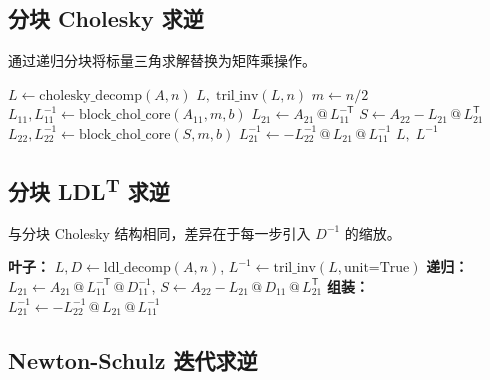 \documentclass[11pt,a4paper]{ctexart}
\begin{document}
\subsection{分块 Cholesky 求逆}

通过递归分块将标量三角求解替换为矩阵乘操作。

\begin{algorithm}[H]
\caption{分块 Cholesky 求逆（递归核心）}
\begin{algorithmic}[1]
        \State $L \gets \text{cholesky\_decomp}(A, n)$ 
        \State \Return $L,\; \text{tril\_inv}(L, n)$
    \EndIf
    \State $m \gets n/2$
    \State $L_{11}, L_{11}^{-1} \gets \text{block\_chol\_core}(A_{11}, m, b)$
    \State $L_{21} \gets A_{21} \mathbin{@} L_{11}^{-{\mathsf T}}$ 
    \State $S \gets A_{22} - L_{21} \mathbin{@} L_{21}^{\mathsf T}$ 
    \State $L_{22}, L_{22}^{-1} \gets \text{block\_chol\_core}(S, m, b)$
    \State $L^{-1}_{21} \gets -L_{22}^{-1} \mathbin{@} L_{21} \mathbin{@} L_{11}^{-1}$ 
    \State \Return $L,\; L^{-1}$
\EndFunction
\end{algorithmic}
\end{algorithm}

\subsection{分块 LDL\textsuperscript{T} 求逆}

与分块 Cholesky 结构相同，差异在于每一步引入 $D^{-1}$ 的缩放。

\begin{algorithm}[H]
\caption{分块 LDL\textsuperscript{T} 求逆（递归核心）}
\begin{algorithmic}[1]
\State \textbf{叶子：} $L, D \gets \text{ldl\_decomp}(A, n)$, $L^{-1} \! \gets \text{tril\_inv}(L, \text{unit=True})$
\State \textbf{递归：} $L_{21} \gets A_{21} \mathbin{@} L_{11}^{-{\mathsf T}} \mathbin{@} D_{11}^{-1}$,
     $S \gets A_{22} - L_{21} \mathbin{@} D_{11} \mathbin{@} L_{21}^{\mathsf T}$
\State \textbf{组装：} $L^{-1}_{21} \gets -L_{22}^{-1} \mathbin{@} L_{21} \mathbin{@} L_{11}^{-1}$
\end{algorithmic}
\end{algorithm}

\subsection{Newton-Schulz 迭代求逆}
\end{document}
